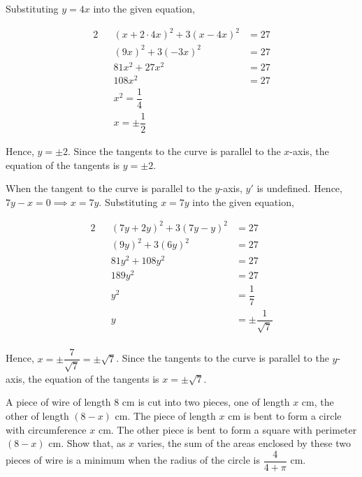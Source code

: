 \documentclass{echw}
\begin{document}
                Substituting $y=4x$ into the given equation,

                \begin{alignat*}{2}
                    &&(x+2 \cdot 4x)^2 + 3(x-4x)^2 &= 27\\
                    &&(9x)^2 + 3(-3x)^2 &= 27\\
                    &&81x^2 + 27x^2 &= 27\\
                    &&108x^2 &= 27\\
                    &&x^2 = \dfrac14\\
                    &&x = \pm \dfrac12
                \end{alignat*}

                Hence, $y = \pm 2$. Since the tangents to the curve is parallel to the $x$-axis, the equation of the tangents is $y = \pm 2$.


            \subpart
                When the tangent to the curve is parallel to the $y$-axis, $y'$ is undefined. Hence, $7y-x =0 \implies x = 7y$. Substituting $x = 7y$ into the given equation,

                \begin{alignat*}{2}
                    &&(7y+2y)^2 + 3(7y-y)^2 &= 27\\
                    &&(9y)^2 + 3(6y)^2 &= 27\\
                    &&81y^2 + 108y^2 &= 27\\
                    &&189y^2 &= 27\\
                    &&y^2 &= \dfrac17\\
                    &&y &= \pm \dfrac1{\sqrt7}\\
                \end{alignat*}

                Hence, $x = \pm \dfrac{7}{\sqrt7} = \pm \sqrt7$. Since the tangents to the curve is parallel to the $y$-axis, the equation of the tangents is $x = \pm \sqrt7$.


    \problem{}
        A piece of wire of length 8 cm is cut into two pieces, one of length $x$ cm, the other of length $(8-x)$ cm. The piece of length $x$ cm is bent to form a circle with circumference $x$ cm. The other piece is bent to form a square with perimeter $(8-x)$ cm. Show that, as $x$ varies, the sum of the areas enclosed by these two pieces of wire is a minimum when the radius of the circle is $\dfrac4{4+\pi}$ cm.
\end{document}
